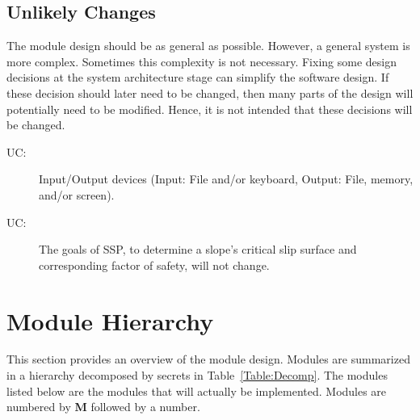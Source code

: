 \documentclass[12pt, titlepage]{article}
\newcommand{\progname}{SSP}
\newcounter{ucnum}
\begin{document}
\subsection{Unlikely Changes} \label{SecUchange}

\hspace{3ex}The module design should be as general as
possible. However, a general system is more complex. Sometimes this
complexity is not necessary. Fixing some design decisions at the
system architecture stage can simplify the software design. If these
decision should later need to be changed, then many parts of the
design will potentially need to be modified. Hence, it is not intended
that these decisions will be changed.

\begin{description}
\item [UC\theucnum \label{UC_IO}:] Input/Output
  devices (Input: File and/or keyboard, Output: File, memory, and/or
  screen).
\item [UC\theucnum \label{UC_SSPGoal}:] The goals of 
\progname{}, to determine a slope's critical slip surface and corresponding 
factor of safety, will not change.
 
\end{description}


\section{Module Hierarchy} \label{SecMH}

\hspace{3ex}This section provides an overview of the module
design. Modules are summarized in a hierarchy decomposed by secrets
in Table~\ref{Table:Decomp}. The modules listed below are the modules
that will actually be implemented. Modules are numbered by \textbf{M}
followed by a number.
\end{document}
